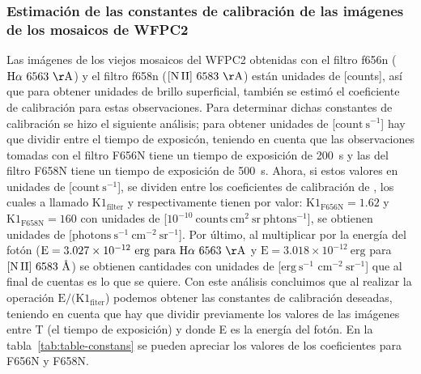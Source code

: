 \subsubsection{Estimación de las  constantes de calibración de las imágenes de los mosaicos de WFPC2}
\label{sec:wpfc2}
Las imágenes de los viejos mosaicos del WFPC2  obtenidas con el filtro f656n (\(\mathrm{\ha~6563~\AA{}}\)) y el filtro f658n (\(\mathrm{\nii~6583~\AA{}}\)) están unidades de [counts], así que para obtener unidades de brillo superficial, también se estimó el coeficiente de calibración para estas observaciones. Para determinar dichas constantes de calibración se hizo el siguiente análisis; para obtener unidades de [\(\mathrm{count~s^{-1}}\)] hay que  dividir entre el tiempo de exposicón, teniendo en cuenta que las observaciones tomadas con el filtro F656N tiene un tiempo de exposición de 200~s y las del filtro F658N tiene un tiempo de exposición de 500~s. Ahora, si estos valores en unidades de [\(\mathrm{count~s^{-1}}\)], se dividen entre los coeficientes de calibración de \citet{Odell:2009}, los cuales a llamado \(\mathrm{K1_{filter}}\) y respectivamente tienen por valor: \(\mathrm{K1_{F656N} = 1.62}\) y \(\mathrm{K1_{F658N} = 160}\) con unidades de [\(\mathrm{10^{-10}~counts~cm^{2}~sr~phtons^{-1}}\)], se obtienen unidades de [\(\mathrm{photons~s^{-1}~cm^{-2}~sr^{-1}}\)]. Por último, al multiplicar por la energía del fotón (\(\mathrm{E=3.027\times 10^{-12}~erg~para~\ha{}~6563~\AA{}}\) y \(\mathrm{E=3.018 \times10^{-12}~erg}\) para \(\mathrm{[N\,II]}{}~6583~\text{\AA{}}{}\)) se obtienen cantidades con unidades de [\(\mathrm{erg~s^{-1}}\)  \(\mathrm{cm^{-2}~sr^{-1}}\)] que al final de cuentas es lo que se quiere.  Con este análisis concluimos que al realizar la operación \(\text{E}/(\mathrm{K1_{fiter}}\))  podemos obtener las constantes de calibración deseadas, teniendo en cuenta que hay que dividir previamente los valores de las imágenes entre T (el tiempo de exposición) y donde E es la energía del fotón. En la tabla~\ref{tab:table-constans} se pueden apreciar los valores de los coeficientes para F656N y F658N.



